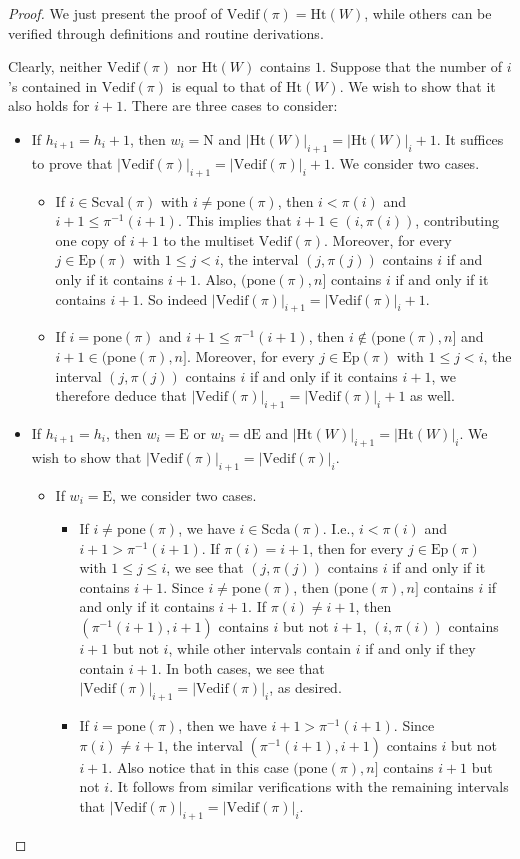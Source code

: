 \documentclass[12pt]{amsart}
\numberwithin{equation}{section}
\theoremstyle{plain}
\theoremstyle{definition}
\def\N{\mathrm{N}}
\def\E{\mathrm{E}}
\def\dE{\mathrm{dE}}
\def\Het{\mathrm{Ht}}
\def\Excp{\mathrm{Ep}}
\def\Scval{\mathrm{Scval}}
\def\Scda{\mathrm{Scda}}
\def\Vedif{\mathrm{Vedif}}
\def\pone{\mathrm{pone}}
\begin{document}
\begin{proof}
We just present the proof of $\Vedif(\pi)=\Het(W)$, while others can be verified through definitions and routine derivations.

Clearly, neither $\Vedif(\pi)$ nor $\Het(W)$ contains $1$. Suppose that the number of $i$'s contained in $\Vedif(\pi)$ is equal to that of $\Het(W)$. We wish to show that it also holds for $i+1$. There are three cases to consider:
\begin{itemize}
  \item If $h_{i+1}=h_{i}+1$, then $w_{i}=\N$ and
$|\Het(W)|_{i+1}=|\Het(W)|_{i}+1$. It suffices to prove that $|\Vedif(\pi)|_{i+1}=|\Vedif(\pi)|_{i}+1$. We consider two cases.
   \begin{itemize}
     \item  If $i \in \Scval(\pi)$ with $i\neq\pone(\pi)$, then $i < \pi(i)$ and $i+1 \leq \pi^{-1}(i+1)$. This implies that $i+1 \in (i,\pi(i))$, contributing one copy of $i+1$ to the multiset $\Vedif(\pi)$. Moreover, for every $j\in\Excp(\pi)$ with $1 \leq j < i$, the interval $(j,\pi(j))$ contains $i$ if and only if it contains $i+1$. Also, $(\pone(\pi),n]$ contains $i$  if and only if it contains $i+1$. So indeed $|\Vedif(\pi)|_{i+1}=|\Vedif(\pi)|_{i}+1$.
     \item  If $i=\pone(\pi)$ and $i+1 \leq \pi^{-1}(i+1)$, then $i \notin (\pone(\pi),n]$ and $i+1 \in (\pone(\pi),n]$. Moreover, for every $j\in\Excp(\pi)$ with $1 \leq j < i$, the interval $(j,\pi(j))$ contains $i$ if and only if it contains $i+1$, we therefore deduce that $|\Vedif(\pi)|_{i+1}=|\Vedif(\pi)|_{i}+1$ as well.
   \end{itemize}

  \item If $h_{i+1}=h_i$, then $w_i=\E$ or $w_i=\dE$ and $|\Het(W)|_{i+1}=|\Het(W)|_{i}$. We wish to show that $|\Vedif(\pi)|_{i+1}=|\Vedif(\pi)|_{i}$.
    \begin{itemize}
        \item If $w_i=\E$, we consider two cases.
        \begin{itemize}
            \item If $i \neq \pone(\pi)$, we have $i \in \Scda(\pi)$. I.e., $i < \pi(i)$ and $i+1 > \pi^{-1}(i+1)$. If $\pi(i)=i+1$, then for every $j\in\Excp(\pi)$ with $1 \leq j \le i$, we see that $(j,\pi(j))$ contains $i$ if and only if it contains $i+1$. Since $i \neq \pone(\pi)$, then $(\pone(\pi),n]$ contains $i$  if and only if it contains $i+1$.
            If $\pi(i) \neq i+1$, then $(\pi^{-1}(i+1),i+1)$ contains $i$ but not $i+1$, $(i,\pi(i))$ contains $i+1$ but not $i$, while other intervals contain $i$ if and only if they contain $i+1$. In both cases, we see that $|\Vedif(\pi)|_{i+1}=|\Vedif(\pi)|_{i}$, as desired.
            \item If $i=\pone(\pi)$, then we have $i+1>\pi^{-1}(i+1)$. Since $\pi(i) \neq i+1$, the interval $(\pi^{-1}(i+1),i+1)$ contains $i$ but not $i+1$. Also notice that in this case $(\pone(\pi),n]$ contains $i+1$ but not $i$. It follows from similar verifications with the remaining intervals that $|\Vedif(\pi)|_{i+1}=|\Vedif(\pi)|_{i}$.
        \end{itemize}


\end{itemize}
\end{itemize}
\end{proof}
\end{document}

